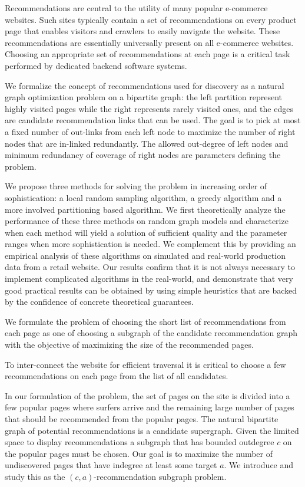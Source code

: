 \abstract


Recommendations are central to the utility of many popular e-commerce
websites. Such sites typically contain a set of recommendations on
every product page that enables visitors and crawlers to easily
navigate the website.  These recommendations are essentially universally present
on all e-commerce websites. Choosing an appropriate set of recommendations
at each page is a critical task performed by dedicated backend
software systems. \vs

We formalize the concept of recommendations used for discovery as a natural graph optimization
problem on a bipartite graph: the left partition represent highly visited pages while the right 
represents rarely visited ones, and the edges are candidate recommendation links that can be used. 
The goal is to pick at most a fixed number of out-links from each left node to maximize the number of 
right nodes that are in-linked redundantly. The allowed out-degree of left nodes and minimum redundancy
 of coverage of right nodes are parameters defining the problem.

We propose three methods for solving the problem in increasing order
of sophistication: a local random sampling algorithm, a greedy algorithm
and a more involved partitioning based algorithm. 
We first theoretically analyze the performance of these three methods
on random graph models and characterize when each method will yield a
solution of sufficient quality and the parameter ranges when more
sophistication is needed. We complement this by providing an empirical
analysis of these algorithms on simulated and real-world production
data from a retail website. Our results confirm that it is not always necessary to implement  complicated algorithms in the real-world, and
demonstrate that very good practical results can be obtained by
using simple heuristics that are backed by the confidence of concrete
theoretical guarantees. \vs

\iffalse

We formulate the problem of choosing the short list of recommendations from each page as one of choosing a subgraph of the candidate recommendation graph with the objective of maximizing the size of the recommended pages.

To inter-connect the website for efficient
traversal it is critical to choose a few recommendations on each
page from the list of all candidates.

In our formulation of the problem, the set of pages on the site is
divided into a few popular pages where surfers arrive and the
remaining large number of pages that should be recommended from the
popular pages. The natural bipartite graph of potential
recommendations is a candidate supergraph. Given the limited space to
display recommendations a subgraph that has bounded outdegree $c$ on the
popular pages must be chosen. Our goal is to maximize the number of
undiscovered pages that have indegree at least some target $a$. We introduce and study this
as the $(c, a)$-recommendation subgraph problem.

